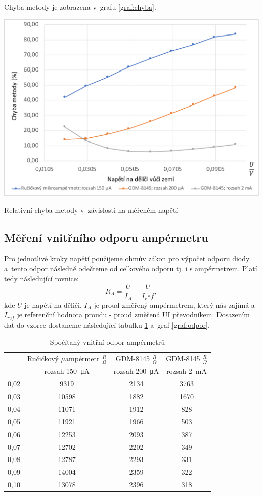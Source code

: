 \documentclass[a4paper,12pt]{article}   %
\newcommand{\tmu}{$\mu$}
\begin{document}
Chyba metody je zobrazena v~grafu \ref{graf:chyba}.
\begin{graf}
    \centering
    \includegraphics[width=.8\textwidth]{graf_chyba.pdf}
    \caption{Relativní chyba metody v~závislosti na měřeném napětí}
    \label{graf:chyba}
\end{graf}

\subsection{Měření vnitřního odporu ampérmetru}
Pro jednotlivé kroky napětí použijeme ohmův zákon pro výpočet odporu diody a~tento odpor následně odečteme od celkového odporu tj. i s ampérmetrem. Platí tedy následující rovnice:
\begin{equation}
    R_A=\frac{U}{I_A} - \frac{U}{I_ref},
\end{equation}
kde $U$ je napětí na děliči, $I_A$ je proud změřený ampérmetrem, který nás zajímá a~$I_{ref}$ je referenční hodnota proudu - proud změřená UI převodníkem. Dosazením dat do vzorce dostaneme následující tabulku \ref{tab:odpor} a~graf \ref{graf:odpor}.
\begin{table}[h!]
    \centering
    \begin{tabular}{|c|c|c|c|}
        \hline
        \rule{0pt}{2.5ex}
        \multirow{2}{*}{Napětí na děliči} &Ručičkový \tmu ampérmetr	$\frac{R}{\Omega}$ &GDM-8145 $\frac{R}{\Omega}$	&GDM-8145 $\frac{R}{\Omega}$\\[.7ex]
        & rozsah  150~μA & rozsah 200~μA & rozsah  2~mA \\\hline\hline
        0,02 & 9319  & 2134 & 3763 \\\hline
        0,03 & 10598 & 1882 & 1670 \\\hline
        0,04 & 11071 & 1912 & 828  \\\hline
        0,05 & 11921 & 1966 & 503  \\\hline
        0,06 & 12253 & 2093 & 387  \\\hline
        0,07 & 12702 & 2202 & 349  \\\hline
        0,08 & 12787 & 2293 & 331  \\\hline
        0,09 & 14004 & 2359 & 322  \\\hline
        0,10 & 13078 & 2396 & 318  \\\hline
    \end{tabular}
    \caption{Spočítaný vnitřní odpor ampérmetrů}
    \label{tab:odpor}
\end{table}
\end{document}
